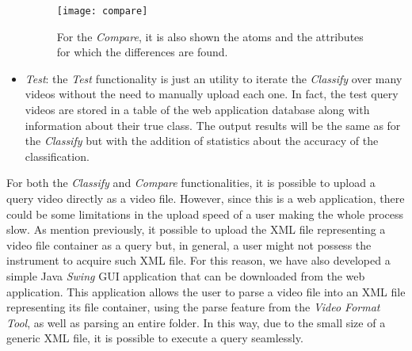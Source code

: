 \begin{itemize}
\begin{figure}
  \centering
  \texttt{[image: compare]}
  \caption{For the \emph{Compare}, it is also shown the atoms and the attributes for which the differences are found.}\label{fig:compare}
\end{figure}

\item \emph{Test}: the \emph{Test} functionality is just an utility to iterate the \emph{Classify} over many videos without the need to manually upload each one. In fact, the test query videos are stored in a table of the web application database along with information about their true class. The output results will be the same as for the \emph{Classify} but with the addition of statistics about the accuracy of the classification.

\end{itemize}

For both the \emph{Classify} and \emph{Compare} functionalities, it is possible to upload a query video directly as a video file. However, since this is a web application, there could be some limitations in the upload speed of a user making the whole process slow. As mention previously, it possible to upload the XML file representing a video file container as a query but, in general, a user might not possess the instrument to acquire such XML file. For this reason, we have also developed a simple Java \emph{Swing} GUI application that can be downloaded from the web application. This application allows the user to parse a video file into an XML file representing its file container, using the parse feature from the \emph{Video Format Tool}, as well as parsing an entire folder. In this way, due to the small size of a generic XML file, it is possible to execute a query seamlessly.